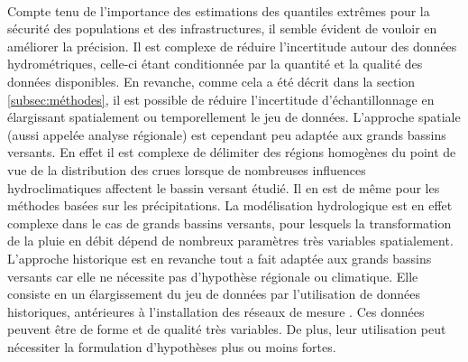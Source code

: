 	\paragraph{} Compte tenu de l'importance des estimations des quantiles extrêmes pour la sécurité des populations et des infrastructures, il semble évident de vouloir en améliorer la précision. Il est complexe de réduire l'incertitude autour des données hydrométriques, celle-ci étant conditionnée par la quantité et la qualité des données disponibles. En revanche, comme cela a été décrit dans la section \ref{subsec:méthodes}, il est possible de réduire l'incertitude d'échantillonnage en élargissant spatialement ou temporellement le jeu de données. L'approche spatiale (aussi appelée analyse régionale) est cependant peu adaptée aux grands bassins versants. En effet il est complexe de délimiter des régions homogènes du point de vue de la distribution des crues lorsque de nombreuses influences hydroclimatiques affectent le bassin versant étudié. Il en est de même pour les méthodes basées sur les précipitations. La modélisation hydrologique est en effet complexe dans le cas de grands bassins versants, pour lesquels la transformation de la pluie en débit dépend de nombreux paramètres très variables spatialement. L'approche historique est en revanche tout a fait adaptée aux grands bassins versants car elle ne nécessite pas d'hypothèse régionale ou climatique. Elle consiste en un élargissement du jeu de données par l'utilisation de données historiques, antérieures à l'installation des réseaux de mesure \citep{brazdil_historical_2006}. Ces données peuvent être de forme et de qualité très variables. De plus, leur utilisation peut nécessiter la formulation d'hypothèses plus ou moins fortes. 
	
